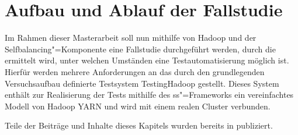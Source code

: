\chapter{Aufbau und Ablauf der Fallstudie}
\label{ch:caseStudy}

Im Rahmen dieser Masterarbeit soll nun mithilfe von Hadoop und der Selfbalancing"=Komponente eine Fallstudie durchgeführt werden, durch die ermittelt wird, unter welchen Umständen eine Testautomatisierung möglich ist.
Hierfür werden mehrere Anforderungen an das durch den grundlegenden Versuchsaufbau definierte Testsystem TestingHadoop gestellt.
Dieses System enthält zur Realisierung der Tests mithilfe des \gls{ss}"=Frameworks ein vereinfachtes Modell von Hadoop YARN und wird mit einem realen Cluster verbunden.

Teile der Beiträge und Inhalte dieses Kapitels wurden bereits in \cite{Eberhardinger2018} publiziert.






